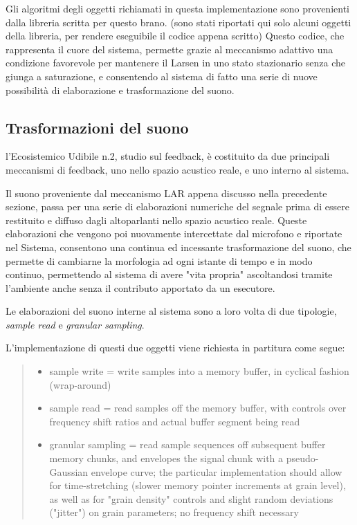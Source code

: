 Gli algoritmi degli oggetti richiamati in questa implementazione sono 
provenienti dalla libreria scritta per questo brano.
(sono stati riportati qui solo alcuni oggetti della libreria, per rendere eseguibile
il codice appena scritto)
Questo codice, che rappresenta il cuore del sistema,
permette grazie al meccanismo adattivo una condizione favorevole
per mantenere il Larsen in uno stato stazionario senza che giunga a 
saturazione, e consentendo al sistema
di fatto una serie di nuove possibilità di elaborazione e trasformazione del suono.

\subsection{Trasformazioni del suono}
\label{sec:Trasformazioni del suono}

l’Ecosistemico Udibile n.2, studio sul feedback, è costituito
da due principali meccanismi di feedback, uno nello spazio acustico reale,
e uno interno al sistema.

Il suono proveniente dal meccanismo LAR appena discusso nella precedente sezione,
passa per una serie di elaborazioni numeriche del segnale prima di essere restituito
e diffuso dagli altoparlanti nello spazio acustico reale. Queste elaborazioni
che vengono poi nuovamente intercettate dal microfono e riportate nel Sistema,
consentono una continua ed incessante trasformazione del suono, che permette
di cambiarne la morfologia ad ogni istante di tempo e in modo continuo, 
permettendo al sistema di avere "vita propria" ascoltandosi tramite l'ambiente
anche senza il contributo apportato da un esecutore.

Le elaborazioni del suono interne al sistema sono a loro volta di due tipologie,
\textit{sample read} e \textit{granular sampling}.

L'implementazione di questi due oggetti viene richiesta in partitura come segue:

\begin{quote}
\begin{itemize}
  \item sample write = write samples into a memory buffer, in cyclical fashion (wrap-around)
  \item sample read = read samples off the memory buffer, with controls over frequency shift ratios and actual buffer segment being read
  \item granular sampling = read sample sequences off subsequent buffer memory chunks, and envelopes the signal chunk with a pseudo-Gaussian envelope curve; the particular
    implementation should allow for time-stretching (slower memory pointer increments at grain level), as well as for "grain density" controls and slight random deviations ("jitter") on
    grain parameters; no frequency shift necessary
\end{itemize}
\end{quote}

